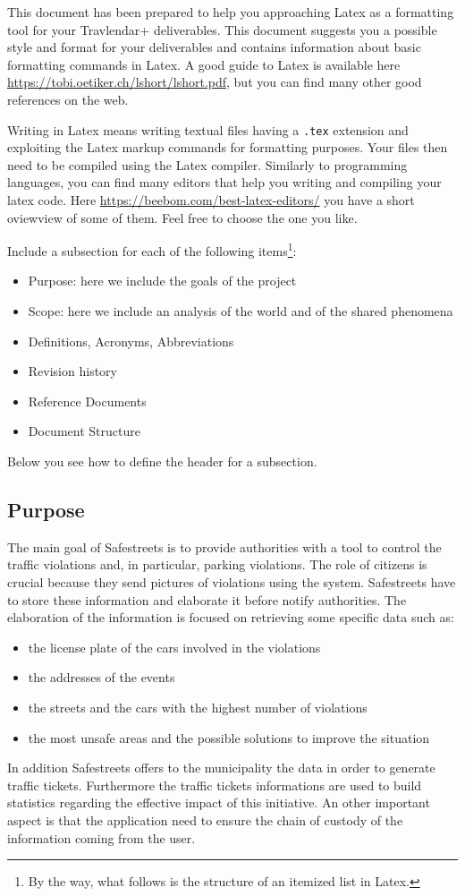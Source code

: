 This document has been prepared to help you approaching Latex as a formatting tool for your Travlendar+ deliverables. This document suggests you a possible style and format for your deliverables and contains information about basic formatting commands in Latex. A good guide to Latex is available here \href{https://tobi.oetiker.ch/lshort/lshort.pdf}{https://tobi.oetiker.ch/lshort/lshort.pdf}, but you can find many other good references on the web. 

Writing in Latex means writing textual files having a \texttt{.tex} extension and exploiting the Latex markup commands for formatting purposes. Your files then need to be compiled using the Latex compiler. Similarly to programming languages, you can find many editors that help you writing and compiling your latex code. Here \href{https://beebom.com/best-latex-editors/}{https://beebom.com/best-latex-editors/} you have a short oviewview of some of them. Feel free to choose the one you like.  

Include a subsection for each of the following items\footnote{By the way, what follows is the structure of an itemized list in Latex.}:
\begin{itemize}
\item
Purpose: here we include the goals of the project
\item
Scope: here we include an analysis of the world and of the shared phenomena
\item
Definitions, Acronyms, Abbreviations
\item
Revision history
\item
Reference Documents 
\item
Document Structure
\end{itemize}
Below you see how to define the header for a subsection.
\subsection{Purpose}
The main goal of Safestreets is to provide authorities with a tool to control the traffic violations and, in particular, parking violations. The role of citizens is crucial because they send pictures of violations using the system. Safestreets have to store these information and elaborate it before notify authorities.
The elaboration of the information is focused on retrieving some specific data such as:
\begin{itemize}
	\item
	the license plate of the cars involved in the violations
	\item
	the addresses of the events
	\item 
	the streets and the cars with the highest number of violations
	\item 
	the most unsafe areas and the possible solutions to improve the situation
\end{itemize}
In addition Safestreets offers to the municipality the data in order to generate traffic tickets. Furthermore the traffic tickets informations are used to build statistics regarding the effective impact of this initiative.
An other important aspect is that the application need to ensure the chain of custody of the information coming from the user.

